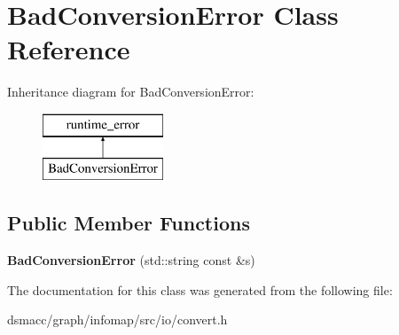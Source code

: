 \hypertarget{classBadConversionError}{}\section{Bad\+Conversion\+Error Class Reference}
\label{classBadConversionError}
Inheritance diagram for Bad\+Conversion\+Error\+:\begin{figure}[H]
\begin{center}
\leavevmode
\includegraphics[height=2.000000cm]{classBadConversionError}
\end{center}
\end{figure}
\subsection*{Public Member Functions}
\begin{DoxyCompactItemize}
\item 
\mbox{\label{classBadConversionError_af5def84140669df61a44c53ed394dfc3}} 
{\bfseries Bad\+Conversion\+Error} (std\+::string const \&s)
\end{DoxyCompactItemize}


The documentation for this class was generated from the following file\+:\begin{DoxyCompactItemize}
\item 
dsmacc/graph/infomap/src/io/convert.\+h\end{DoxyCompactItemize}

